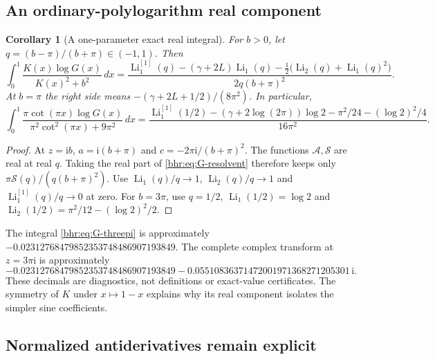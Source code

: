 \documentclass[11pt]{article}
\numberwithin{equation}{section}
\theoremstyle{plain}
\newtheorem{corollary}[theorem]{Corollary}
\theoremstyle{definition}
\theoremstyle{remark}
\DeclareMathOperator{\Li}{Li}
\newcommand{\ii}{\mathrm i}
\begin{document}
\subsection{An ordinary-polylogarithm real component}

\begin{corollary}[A one-parameter exact real integral]\label{bhr:cor:G-real}
For $b>0$, let $q=(b-\pi)/(b+\pi)\in(-1,1)$. Then
\begin{equation}\label{bhr:eq:G-real}
 \boxed{\displaystyle
 \int_0^1\frac{K(x)\log G(x)}{K(x)^2+b^2}\,dx
 =\frac{\Li_1^{[1]}(q)-(\gamma+2L)\Li_1(q)
       -\frac12\bigl(\Li_2(q)+\Li_1(q)^2\bigr)}
               {2q(b+\pi)^2}.}
\end{equation}
At $b=\pi$ the right side means
$-(\gamma+2L+1/2)/(8\pi^2)$. In particular,
\begin{equation}\label{bhr:eq:G-threepi}
 \boxed{\displaystyle
 \int_0^1\frac{\pi\cot(\pi x)\log G(x)}
                      {\pi^2\cot^2(\pi x)+9\pi^2}\,dx
 =\frac{\Li_1^{[1]}(1/2)-(\gamma+2\log(2\pi))\log2
                    -\pi^2/24-(\log2)^2/4}{16\pi^2}.}
\end{equation}
\end{corollary}
\begin{proof}
At $z=\ii b$, $a=\ii(b+\pi)$ and
$c=-2\pi\ii/(b+\pi)^2$. The functions $\mathcal A,
\mathcal S$ are real at real $q$. Taking the real part of
\eqref{bhr:eq:G-resolvent} therefore keeps only
$\pi\mathcal S(q)/(q(b+\pi)^2)$.
Use $\Li_1(q)/q\to1$, $\Li_2(q)/q\to1$ and
$\Li_1^{[1]}(q)/q\to0$ at zero. For $b=3\pi$, use
$q=1/2$, $\Li_1(1/2)=\log2$ and
$\Li_2(1/2)=\pi^2/12-(\log2)^2/2$.
\end{proof}

The integral \eqref{bhr:eq:G-threepi} is approximately
$-0.02312768479852353748486907193849$.
The complete complex transform at $z=3\pi\ii$ is approximately
\[
 -0.02312768479852353748486907193849
   -0.05510836371472001971368271205301\,\ii.
\]
These decimals are diagnostics, not definitions or exact-value
certificates. The symmetry of $K$ under $x\mapsto1-x$ explains
why its real component isolates the simpler sine coefficients.

\subsection{Normalized antiderivatives remain explicit}
\end{document}
